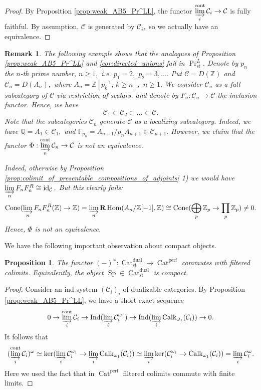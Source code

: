 \documentclass[11pt,leqno]{amsart}
\newtheorem{prop}[theo]{Proposition}
\newtheorem{remark}[theo]{Remark}
\numberwithin{equation}{section}
\def\Z{\mathbb{Z}}
\def\Q{\mathbb{Q}}
\def\bR{{\mathbf R}}
\def\Hom{\operatorname{Hom}}
\newcommand{\indlim}[1][]{\mathop{\varinjlim}\limits_{#1}}
\newcommand{\prodd}[1][]{\mathop{\prod}\limits_{#1}}
\newcommand{\Cat}{\operatorname{Cat}}
\newcommand{\Cone}{\operatorname{Cone}}
\newcommand{\cont}{\operatorname{cont}}
\newcommand{\st}{\operatorname{st}}
\newcommand{\dual}{\operatorname{dual}}
\newcommand{\bbF}{{\mathbb F}}
\newcommand{\cC}{{\mathcal C}}
\newcommand{\perf}{\operatorname{perf}}
\newcommand{\Sp}{\operatorname{Sp}}
\newcommand{\Ind}{\operatorname{Ind}}
\newcommand{\Calk}{\operatorname{Calk}}
\newcommand{\id}{\operatorname{id}}
\begin{document}
\begin{proof}By Proposition \ref{prop:weak_AB5_Pr^LL}, the functor $\indlim[i]^{\cont}\cC_i\to\cC$ is fully faithful. By assumption, $\cC$ is generated by $\cC_i,$ so we actually have an equivalence.\end{proof}

\begin{remark}The following example shows that the analogues of Proposition \ref{prop:weak_AB5_Pr^LL} and \ref{cor:directed_unions} fail in $\Pr^L_{\st}.$ Denote by $p_n$ the $n$-th prime number, $n\geq 1,$ i.e. $p_1=2,$ $p_2=3,\dots.$ Put $\cC=D(\Z)$ and $\cC_n=D(A_n),$ where $A_n=\Z[p_k^{-1},\, k\geq n],$ $n\geq 1.$ We consider $\cC_n$ as a full subcategory of $\cC$ via restriction of scalars, and denote by $F_n:\cC_n\to\cC$ the inclusion functor. Hence, we have
$$\cC_1\subset\cC_2\subset\dots\subset\cC.$$
Note that the subcategories $\cC_n$ generate $\cC$ as a localizing subcategory. Indeed, we have $\Q=A_1\in\cC_1,$ and $\bbF_{p_n}=A_{n+1}/p_n A_{n+1}\in\cC_{n+1}.$ However, we claim that the functor $\Phi:\indlim[n]^{\cont}\cC_n\to\cC$ is not an equivalence.

Indeed, otherwise by Proposition \ref{prop:colimit_of_presentable_compositions_of_adjoints} 1) we would have $\indlim[n] F_n F_n^R\cong\id_{\cC}.$ But this clearly fails:
$$\Cone(\indlim[n] F_n F_n^R(\Z)\to\Z)=\indlim[n]\bR\Hom(A_n/\Z[-1],\Z)\cong\Cone(\bigoplus\limits_p\Z_p\to\prodd[p]\Z_p)\ne 0.$$ Hence, $\Phi$ is not an equivalence.\end{remark}

We have the following important observation about compact objects.

\begin{prop}\label{prop:compact_objects_in_filtered_colimits} The functor $(-)^{\omega}:\Cat_{\st}^{\dual}\to\Cat^{\perf}$ commutes with filtered colimits. Equivalently, the object $\Sp\in\Cat_{\st}^{\dual}$ is compact.\end{prop}

\begin{proof}Consider an ind-system $(\cC_i)_i$ of dualizable categories. By Proposition \ref{prop:weak_AB5_Pr^LL}, we have a short exact sequence
$$0\to\indlim[i]^{\cont}\cC_i\to\Ind(\indlim[i]\cC_i^{\omega_1})\to\Ind(\indlim[i]\Calk_{\omega_1}(\cC_i))\to 0.$$
It follows that 
$$(\indlim[i]^{\cont}\cC_i)^{\omega}\simeq\ker(\indlim[i]\cC_i^{\omega_1}\to\indlim[i]\Calk_{\omega_1}(\cC_i))\simeq \indlim[i]\ker(\cC_i^{\omega_1}\to \Calk_{\omega_1}(\cC_i))=\indlim[i]\cC_i^{\omega}.$$
Here we used the fact that in $\Cat^{\perf}$ filtered colimits commute with finite limits.\end{proof}
\end{document}
